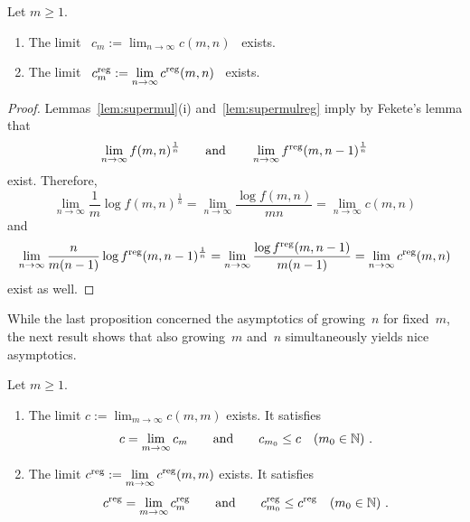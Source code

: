 \begin{prop}
  Let $m\geq 1$.
  \begin{enumerate}
    \item[\rm(i)] The limit \ 
       $c_m:=\displaystyle\lim_{n\rightarrow\infty}  c   (m,n)$ \ exists.
    \item[\rm(ii)] The limit \ 
   $c^{\mathrm{reg}}_m:=\displaystyle\lim_{n\rightarrow\infty} c^{\mathrm{reg}}(m,n)$ \ exists.
  \end{enumerate}
\end{prop}

\begin{proof}
  Lemmas~\ref{lem:supermul}(i) and~\ref{lem:supermulreg} imply by
  Fekete's lemma \cite[Lemma 11.6]{LW} that
  $$
  \lim_{n\rightarrow\infty}f(m,n)^{\frac{1}{n}}
  \qquad\text{and}\qquad
  \lim_{n\rightarrow\infty}f^{\mathrm{reg}}(m,n-1)^{\frac{1}{n}}  
  $$
  exist. Therefore,  
  $$
    \lim_{n\rightarrow\infty}\frac{1}{m}\log f(m,n)^{\frac{1}{n}}
   =\lim_{n\rightarrow\infty}\frac{\log f(m,n)}{mn}
   =\lim_{n\rightarrow\infty}c(m,n)
  $$
  and
  $$
    \lim_{n\rightarrow\infty}\frac{n}{m(n-1)}\log f^{\mathrm{reg}}(m,n-1)^{\frac{1}{n}}
   =\lim_{n\rightarrow\infty}\frac{\log f^{\mathrm{reg}}(m,n-1)}{m(n-1)}
   =\lim_{n\rightarrow\infty}c^{\mathrm{reg}}(m,n)
   $$
  exist as well.
\end{proof}

While the last proposition concerned the asymptotics of growing~$n$ for
fixed~$m$, the next result shows that also growing~$m$ and~$n$
simultaneously yields nice asymptotics.


\begin{prop}
  Let $m\geq 1$.
  \begin{enumerate}
  \item[\rm(i)] The limit
    $c:=\displaystyle\lim_{m\rightarrow\infty}c(m,m)$ exists. It
    satisfies
    $$
    c=\displaystyle\lim_{m\rightarrow\infty}c_m
    \qquad\text{and}\qquad
    c_{m_0}\leq c\quad (m_0\in\mathbb{N})\ .
    $$
  \item[\rm(ii)] The limit
    $c^{\mathrm{reg}}:=\displaystyle\lim_{m\rightarrow\infty}c^{\mathrm{reg}}(m,m)$
    exists. It satisfies
    $$
    c^{\mathrm{reg}}=\displaystyle\lim_{m\rightarrow\infty}c^{\mathrm{reg}}_m
    \qquad\text{and}\qquad
    c^{\mathrm{reg}}_{m_0}\leq c^{\mathrm{reg}}\quad (m_0\in\mathbb{N})\ .
    $$

  \end{enumerate}
\end{prop}

